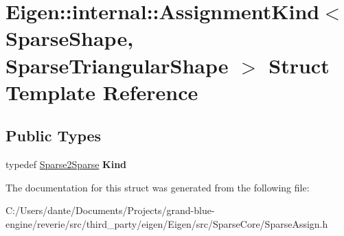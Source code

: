 \hypertarget{struct_eigen_1_1internal_1_1_assignment_kind_3_01_sparse_shape_00_01_sparse_triangular_shape_01_4}{}\section{Eigen\+::internal\+::Assignment\+Kind$<$ Sparse\+Shape, Sparse\+Triangular\+Shape $>$ Struct Template Reference}
\label{struct_eigen_1_1internal_1_1_assignment_kind_3_01_sparse_shape_00_01_sparse_triangular_shape_01_4}
\subsection*{Public Types}
\begin{DoxyCompactItemize}
\item 
\mbox{\label{struct_eigen_1_1internal_1_1_assignment_kind_3_01_sparse_shape_00_01_sparse_triangular_shape_01_4_a4e19ea09f4779069bfbe6460d19f1f47}} 
typedef \mbox{\hyperlink{struct_eigen_1_1internal_1_1_sparse2_sparse}{Sparse2\+Sparse}} {\bfseries Kind}
\end{DoxyCompactItemize}


The documentation for this struct was generated from the following file\+:\begin{DoxyCompactItemize}
\item 
C\+:/\+Users/dante/\+Documents/\+Projects/grand-\/blue-\/engine/reverie/src/third\+\_\+party/eigen/\+Eigen/src/\+Sparse\+Core/Sparse\+Assign.\+h\end{DoxyCompactItemize}
